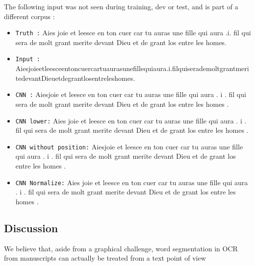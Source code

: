\documentclass{jdmdh}
\begin{document}
The following input was not seen during training, dev or test, and is part of a different corpus :

\begin{itemize} 
    \item \texttt{Truth :} Aies joie et leesce en ton cuer car tu auras une fille qui aura .i. fil qui sera de molt grant merite devant Dieu et de grant los entre les homes.
    \item \texttt{Input :} Aiesjoieetleesceentoncuercartuaurasunefillequiaura.i.filquiserademoltgrantmeritedevantDieuetdegrantlosentreleshomes.
    \item \texttt{CNN :} Aiesjoie et leesce en ton cuer car tu auras une fille qui aura . i . fil qui sera de molt grant merite devant Dieu et de grant los entre les homes .
    \item \texttt{CNN lower:} Aies joie et leesce en ton cuer car tu auras une fille qui aura . i . fil qui sera de molt grant merite devant Dieu et de grant los entre les homes .
    \item \texttt{CNN without position:} Aiesjoie et leesce en ton cuer car tu auras une fille qui aura . i . fil qui sera de molt grant merite devant Dieu et de grant los entre les homes .
    \item \texttt{CNN Normalize:} Aies joie et leesce en ton cuer car tu auras une fille qui aura . i . fil qui sera de molt grant merite devant Dieu et de grant los entre les homes .
\end{itemize}



\subsection{Discussion}

We believe that, aside from a graphical challenge, word segmentation in OCR from manuscripts can actually be treated from a text point of view

\end{document}
